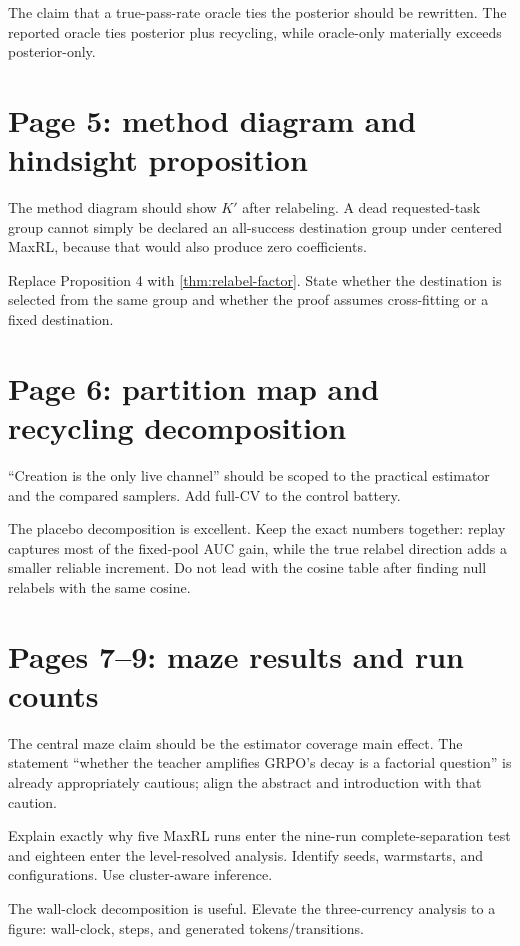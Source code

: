\documentclass[11pt]{article}
\theoremstyle{definition}
\theoremstyle{remark}
\begin{document}
The claim that a true-pass-rate oracle ties the posterior should be rewritten. The reported oracle ties posterior plus recycling, while oracle-only materially exceeds posterior-only.

\section{Page 5: method diagram and hindsight proposition}

The method diagram should show $K'$ after relabeling. A dead requested-task group cannot simply be declared an all-success destination group under centered MaxRL, because that would also produce zero coefficients.

Replace Proposition 4 with \cref{thm:relabel-factor}. State whether the destination is selected from the same group and whether the proof assumes cross-fitting or a fixed destination.

\section{Page 6: partition map and recycling decomposition}

``Creation is the only live channel'' should be scoped to the practical estimator and the compared samplers. Add full-CV to the control battery.

The placebo decomposition is excellent. Keep the exact numbers together: replay captures most of the fixed-pool AUC gain, while the true relabel direction adds a smaller reliable increment. Do not lead with the cosine table after finding null relabels with the same cosine.

\section{Pages 7--9: maze results and run counts}

The central maze claim should be the estimator coverage main effect. The statement ``whether the teacher amplifies GRPO's decay is a factorial question'' is already appropriately cautious; align the abstract and introduction with that caution.

Explain exactly why five MaxRL runs enter the nine-run complete-separation test and eighteen enter the level-resolved analysis. Identify seeds, warmstarts, and configurations. Use cluster-aware inference.

The wall-clock decomposition is useful. Elevate the three-currency analysis to a figure: wall-clock, steps, and generated tokens/transitions.
\end{document}
